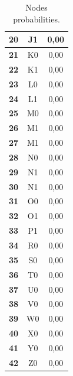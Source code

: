 \documentclass{article}
\begin{document}
\begin{table}[!ht]
\begin{tabular}{c||c|c|}
\multicolumn{1}{|c||}{\cellcolor{gray90}\textbf{20}} & J1 & 0,00 \\ \hline
\multicolumn{1}{|c||}{\cellcolor{gray90}\textbf{21}} & K0 & 0,00 \\ \hline
\multicolumn{1}{|c||}{\cellcolor{gray90}\textbf{22}} & K1 & 0,00 \\ \hline
\multicolumn{1}{|c||}{\cellcolor{gray90}\textbf{23}} & L0 & 0,00 \\ \hline
\multicolumn{1}{|c||}{\cellcolor{gray90}\textbf{24}} & L1 & 0,00 \\ \hline
\multicolumn{1}{|c||}{\cellcolor{gray90}\textbf{25}} & M0 & 0,00 \\ \hline
\multicolumn{1}{|c||}{\cellcolor{gray90}\textbf{26}} & M1 & 0,00 \\ \hline
\multicolumn{1}{|c||}{\cellcolor{gray90}\textbf{27}} & M1 & 0,00 \\ \hline
\multicolumn{1}{|c||}{\cellcolor{gray90}\textbf{28}} & N0 & 0,00 \\ \hline
\multicolumn{1}{|c||}{\cellcolor{gray90}\textbf{29}} & N1 & 0,00 \\ \hline
\multicolumn{1}{|c||}{\cellcolor{gray90}\textbf{30}} & N1 & 0,00 \\ \hline
\multicolumn{1}{|c||}{\cellcolor{gray90}\textbf{31}} & O0 & 0,00 \\ \hline
\multicolumn{1}{|c||}{\cellcolor{gray90}\textbf{32}} & O1 & 0,00 \\ \hline
\multicolumn{1}{|c||}{\cellcolor{gray90}\textbf{33}} & P1 & 0,00 \\ \hline
\multicolumn{1}{|c||}{\cellcolor{gray90}\textbf{34}} & R0 & 0,00 \\ \hline
\multicolumn{1}{|c||}{\cellcolor{gray90}\textbf{35}} & S0 & 0,00 \\ \hline
\multicolumn{1}{|c||}{\cellcolor{gray90}\textbf{36}} & T0 & 0,00 \\ \hline
\multicolumn{1}{|c||}{\cellcolor{gray90}\textbf{37}} & U0 & 0,00 \\ \hline
\multicolumn{1}{|c||}{\cellcolor{gray90}\textbf{38}} & V0 & 0,00 \\ \hline
\multicolumn{1}{|c||}{\cellcolor{gray90}\textbf{39}} & W0 & 0,00 \\ \hline
\multicolumn{1}{|c||}{\cellcolor{gray90}\textbf{40}} & X0 & 0,00 \\ \hline
\multicolumn{1}{|c||}{\cellcolor{gray90}\textbf{41}} & Y0 & 0,00 \\ \hline
\multicolumn{1}{|c||}{\cellcolor{gray90}\textbf{42}} & Z0 & 0,00 \\ \hline
\end{tabular}
\caption{Nodes probabilities.}
\end{table}
\end{document}
